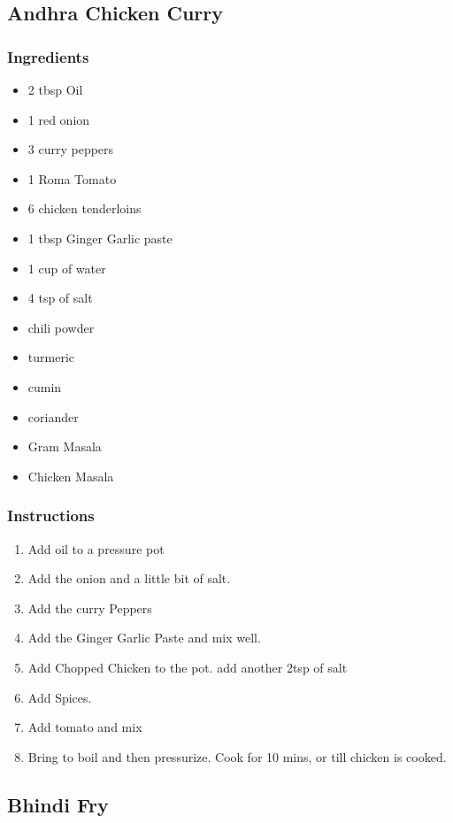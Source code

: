 \documentclass[11pt]{article}
\begin{document}
\subsection{Andhra Chicken Curry}
\label{sec:orgb531969}
\subsubsection*{Ingredients}
\label{sec:orgc34771e}
\begin{itemize}
\item 2 tbsp Oil
\item 1 red onion
\item 3 curry peppers
\item 1 Roma Tomato
\item 6 chicken tenderloins
\item 1 tbsp Ginger Garlic paste
\item 1 cup of water
\item 4 tsp of salt
\item chili powder
\item turmeric
\item cumin
\item coriander
\item Gram Masala
\item Chicken Masala
\end{itemize}
\subsubsection*{Instructions}
\label{sec:orgcbda0ae}
\begin{enumerate}
\item Add oil to a pressure pot
\item Add the onion and a little bit of salt.
\item Add the curry Peppers
\item Add the Ginger Garlic Paste and mix well.
\item Add Chopped Chicken to the pot. add another 2tsp of salt
\item Add Spices.
\item Add tomato and mix
\item Bring to boil and then pressurize. Cook for 10  mins, or till chicken is cooked.
\end{enumerate}
\subsection{Bhindi Fry}
\label{sec:orgf3fed58}
\end{document}
